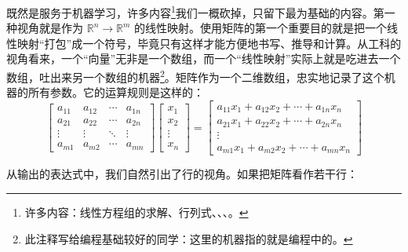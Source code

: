 既然是服务于机器学习，许多内容\footnote{许多内容：线性方程组的求解、行列式、、、。}我们一概砍掉，只留下最为基础的内容。第一种视角就是作为 $\mathbb{R}^n \to \mathbb{R}^m$ 的线性映射。使用矩阵的第一个重要目的就是把一个线性映射“打包”成一个符号，毕竟只有这样才能方便地书写、推导和计算。从工科的视角看来，一个“向量”无非是一个数组，而一个“线性映射”实际上就是吃进去一个数组，吐出来另一个数组的机器\footnote{此注释写给编程基础较好的同学：这里的机器指的就是编程中的。}。矩阵作为一个二维数组，忠实地记录了这个机器的所有参数。它的运算规则是这样的：
\[
    \begin{bmatrix}
        a_{11} & a_{12} & \cdots & a_{1n} \\
        a_{21} & a_{22} & \cdots & a_{2n} \\
        \vdots & \vdots & \ddots & \vdots \\
        a_{m1} & a_{m2} & \cdots & a_{mn}
    \end{bmatrix}
    \begin{bmatrix}
        x_1    \\
        x_2    \\
        \vdots \\
        x_n
    \end{bmatrix}
    =
    \begin{bmatrix}
        a_{11}x_1 + a_{12}x_2 + \cdots + a_{1n}x_n \\
        a_{21}x_1 + a_{22}x_2 + \cdots + a_{2n}x_n \\
        \vdots                                     \\
        a_{m1}x_1 + a_{m2}x_2 + \cdots + a_{mn}x_n
    \end{bmatrix}
\]

从输出的表达式中，我们自然引出了行的视角。如果把矩阵看作若干行：
\begin{figure}[H]
    \centering
\end{figure}

